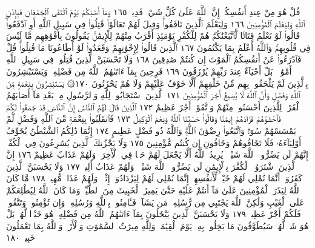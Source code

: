 قُلْ هُوَ مِنْ عِندِ أَنفُسِكُمْۗ إِنَّ ٱللَّهَ عَلَىٰ كُلِّ شَيْءࣲ قَدِيرࣱ ١٦٥
وَمَآ أَصَٰبَكُمْ يَوْمَ ٱلْتَقَى ٱلْجَمْعَانِ فَبِإِذْنِ ٱللَّهِ وَلِيَعْلَمَ ٱلْمُؤْمِنِينَ ١٦٦
وَلِيَعْلَمَ ٱلَّذِينَ نَافَقُوا۟ۚ وَقِيلَ لَهُمْ تَعَالَوْا۟ قَٰتِلُوا۟ فِي سَبِيلِ ٱللَّهِ
أَوِ ٱدْفَعُوا۟ۖ قَالُوا۟ لَوْ نَعْلَمُ قِتَالࣰا لَّٱتَّبَعْنَٰكُمْۗ هُمْ لِلْكُفْرِ يَوْمَئِذٍ
أَقْرَبُ مِنْهُمْ لِلْإِيمَٰنِۚ يَقُولُونَ بِأَفْوَٰهِهِم مَّا لَيْسَ فِي قُلُوبِهِمْۚ
وَٱللَّهُ أَعْلَمُ بِمَا يَكْتُمُونَ ١٦٧ ٱلَّذِينَ قَالُوا۟ لِإِخْوَٰنِهِمْ وَقَعَدُوا۟
لَوْ أَطَاعُونَا مَا قُتِلُوا۟ۗ قُلْ فَٱدْرَءُوا۟ عَنْ أَنفُسِكُمُ ٱلْمَوْتَ إِن
كُنتُمْ صَٰدِقِينَ ١٦٨ وَلَا تَحْسَبَنَّ ٱلَّذِينَ قُتِلُوا۟ فِي سَبِيلِ ٱللَّهِ
أَمْوَٰتَۢاۚ بَلْ أَحْيَآءٌ عِندَ رَبِّهِمْ يُرْزَقُونَ ١٦٩ فَرِحِينَ بِمَآ ءَاتَىٰهُمُ
ٱللَّهُ مِن فَضْلِهِۦ وَيَسْتَبْشِرُونَ بِٱلَّذِينَ لَمْ يَلْحَقُوا۟ بِهِم
مِّنْ خَلْفِهِمْ أَلَّا خَوْفٌ عَلَيْهِمْ وَلَا هُمْ يَحْزَنُونَ ١٧٠۞ يَسْتَبْشِرُونَ
بِنِعْمَةࣲ مِّنَ ٱللَّهِ وَفَضْلࣲ وَأَنَّ ٱللَّهَ لَا يُضِيعُ أَجْرَ
ٱلْمُؤْمِنِينَ ١٧١ ٱلَّذِينَ ٱسْتَجَابُوا۟ لِلَّهِ وَٱلرَّسُولِ مِنۢ بَعْدِ مَآ أَصَابَهُمُ
ٱلْقَرْحُۚ لِلَّذِينَ أَحْسَنُوا۟ مِنْهُمْ وَٱتَّقَوْا۟ أَجْرٌ عَظِيمٌ ١٧٢
ٱلَّذِينَ قَالَ لَهُمُ ٱلنَّاسُ إِنَّ ٱلنَّاسَ قَدْ جَمَعُوا۟ لَكُمْ فَٱخْشَوْهُمْ
فَزَادَهُمْ إِيمَٰنࣰا وَقَالُوا۟ حَسْبُنَا ٱللَّهُ وَنِعْمَ ٱلْوَكِيلُ ١٧٣
فَٱنقَلَبُوا۟ بِنِعْمَةࣲ مِّنَ ٱللَّهِ وَفَضْلࣲ لَّمْ يَمْسَسْهُمْ سُوٓءࣱ وَٱتَّبَعُوا۟
رِضْوَٰنَ ٱللَّهِۗ وَٱللَّهُ ذُو فَضْلٍ عَظِيمٍ ١٧٤ إِنَّمَا ذَٰلِكُمُ ٱلشَّيْطَٰنُ
يُخَوِّفُ أَوْلِيَآءَهُۥ فَلَا تَخَافُوهُمْ وَخَافُونِ إِن كُنتُم مُّؤْمِنِينَ ١٧٥
وَلَا يَحْزُنكَ ٱلَّذِينَ يُسَٰرِعُونَ فِي ٱلْكُفْرِۚ إِنَّهُمْ لَن يَضُرُّوا۟ ٱللَّهَ
شَيْـࣰٔاۚ يُرِيدُ ٱللَّهُ أَلَّا يَجْعَلَ لَهُمْ حَظࣰّا فِي ٱلْأٓخِرَةِۖ وَلَهُمْ عَذَابٌ
عَظِيمٌ ١٧٦ إِنَّ ٱلَّذِينَ ٱشْتَرَوُا۟ ٱلْكُفْرَ بِٱلْإِيمَٰنِ لَن يَضُرُّوا۟ ٱللَّهَ
شَيْـࣰٔاۖ وَلَهُمْ عَذَابٌ أَلِيمࣱ ١٧٧ وَلَا يَحْسَبَنَّ ٱلَّذِينَ كَفَرُوٓا۟ أَنَّمَا
نُمْلِي لَهُمْ خَيْرࣱ لِّأَنفُسِهِمْۚ إِنَّمَا نُمْلِي لَهُمْ لِيَزْدَادُوٓا۟ إِثْمࣰاۖ وَلَهُمْ
عَذَابࣱ مُّهِينࣱ ١٧٨ مَّا كَانَ ٱللَّهُ لِيَذَرَ ٱلْمُؤْمِنِينَ عَلَىٰ مَآ أَنتُمْ
عَلَيْهِ حَتَّىٰ يَمِيزَ ٱلْخَبِيثَ مِنَ ٱلطَّيِّبِۗ وَمَا كَانَ ٱللَّهُ لِيُطْلِعَكُمْ
عَلَى ٱلْغَيْبِ وَلَٰكِنَّ ٱللَّهَ يَجْتَبِي مِن رُّسُلِهِۦ مَن يَشَآءُۖ فَـَٔامِنُوا۟ بِٱللَّهِ
وَرُسُلِهِۦۚ وَإِن تُؤْمِنُوا۟ وَتَتَّقُوا۟ فَلَكُمْ أَجْرٌ عَظِيمࣱ ١٧٩ وَلَا يَحْسَبَنَّ
ٱلَّذِينَ يَبْخَلُونَ بِمَآ ءَاتَىٰهُمُ ٱللَّهُ مِن فَضْلِهِۦ هُوَ خَيْرࣰا لَّهُمۖ
بَلْ هُوَ شَرࣱّ لَّهُمْۖ سَيُطَوَّقُونَ مَا بَخِلُوا۟ بِهِۦ يَوْمَ ٱلْقِيَٰمَةِۗ وَلِلَّهِ
مِيرَٰثُ ٱلسَّمَٰوَٰتِ وَٱلْأَرْضِۗ وَٱللَّهُ بِمَا تَعْمَلُونَ خَبِيرࣱ ١٨٠
